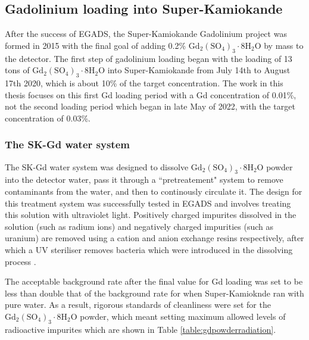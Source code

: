 \subsection{Gadolinium loading into Super-Kamiokande}

After the success of EGADS, the Super-Kamiokande Gadolinium project was formed in 2015 with the final goal of adding 0.2\% $\mathrm{Gd}_{2}\left(\mathrm{SO}_{4}\right)_{3} \cdot 8 \mathrm{H}_{2} \mathrm{O}$ by mass to the detector. The first step of gadolinium loading began with the loading of 13 tons of $\mathrm{Gd}_{2}\left(\mathrm{SO}_{4}\right)_{3} \cdot 8 \mathrm{H}_{2} \mathrm{O}$ into Super-Kamiokande from July 14th to August 17th 2020, which is about 10\% of the target concentration. The work in this thesis focuses on this first Gd loading period with a Gd concentration of 0.01\%, not the second loading period which began in late May of 2022, with the target concentration of 0.03\%.

\subsubsection{The SK-Gd water system}

The SK-Gd water system was designed to dissolve $\mathrm{Gd}_{2}\left(\mathrm{SO}_{4}\right)_{3} \cdot 8 \mathrm{H}_{2} \mathrm{O}$ powder into the detector water, pass it through a ``pretreatement" system to remove contaminants from the water, and then to continously circulate it. The design for this treatment system was successfully tested in EGADS and involves treating this solution with ultraviolet light. Positively charged impurites dissolved in the solution (such as radium ions) and negatively charged impurities (such as uranium) are removed using a cation and anion exchange resins respectively, after which a UV steriliser removes bacteria which were introduced in the dissolving process \cite{10.1093/ptep/ptac170}. 

The acceptable background rate after the final value for Gd loading  was set to be less than double that of the background rate for when Super-Kamioknde ran with pure water. As a result, rigorous standards of cleanliness were set for the $\mathrm{Gd}_{2}\left(\mathrm{SO}_{4}\right)_{3} \cdot 8 \mathrm{H}_{2} \mathrm{O}$ powder, which meant setting maximum allowed levels of radioactive impurites which are shown in Table \ref{table:gdpowderradiation}.

